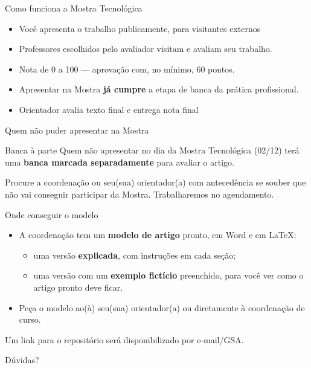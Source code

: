 \documentclass[12pt,aspectratio=169]{beamer}
\begin{document}
\begin{frame}{Como funciona a Mostra Tecnológica}
  \begin{itemize}
    \item Você apresenta o trabalho publicamente, para visitantes externos
    \item Professores escolhidos pelo avaliador visitam e avaliam seu trabalho.
    \item Nota de 0 a 100 --- aprovação com, no mínimo, 60 pontos.
    \item Apresentar na Mostra \textbf{já cumpre} a etapa de banca da
          prática profissional.
    \item Orientador avalia texto final e entrega nota final
  \end{itemize}
\end{frame}

\begin{frame}{Quem não puder apresentar na Mostra}
  \begin{alertblock}{Banca à parte}
    Quem não apresentar no dia da Mostra Tecnológica (02/12) terá uma
    \textbf{banca marcada separadamente} para avaliar o artigo.
  \end{alertblock}
  \vfill
  Procure a coordenação ou seu(sua) orientador(a) com antecedência se
  souber que não vai conseguir participar da Mostra. Trabalharemos no agendamento.
\end{frame}

\begin{frame}{Onde conseguir o modelo}
  \begin{itemize}
    \item A coordenação tem um \textbf{modelo de artigo} pronto, em Word e
          em LaTeX:
    \begin{itemize}
      \item uma versão \textbf{explicada}, com instruções em cada seção;
      \item uma versão com um \textbf{exemplo fictício} preenchido, para
            você ver como o artigo pronto deve ficar.
    \end{itemize}
    \item Peça o modelo ao(à) seu(sua) orientador(a) ou diretamente à
          coordenação de curso.
  \end{itemize}
  Um link para o repositório será disponibilizado por e-mail/GSA.
\end{frame}

\begin{frame}[standout]
  Dúvidas?
\end{frame}
\end{document}

